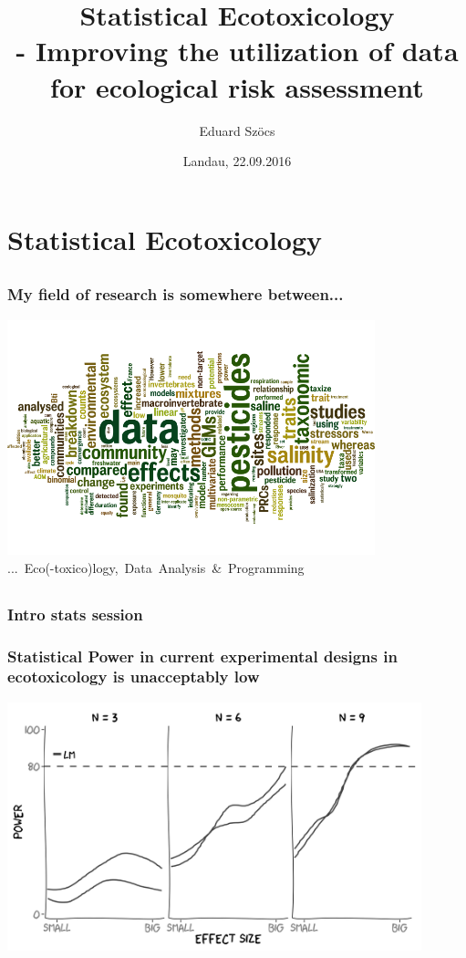 \documentclass[12pt, t, draft]{beamer}
\title{Statistical Ecotoxicology \\ - Improving the utilization of data for ecological risk assessment}
\author{Eduard Szöcs}
\institute{Institute for Environmental Sciences, University of Koblenz-Landau}
\date{Landau, 22.09.2016}
\begin{document}
\begin{frame}
\titlepage
\end{frame}


\section{Statistical Ecotoxicology} 
\subsection{}
\begin{frame}
\frametitle{My field of research is somewhere between...}
\center
\includegraphics[width = 0.8\textwidth]{fig/wc_all.png} \\
\mbox{... Eco(-toxico)logy, Data Analysis \& Programming}
\end{frame}


\subsection{}
\begin{frame}
\frametitle{Intro stats session}
\end{frame}


\begin{frame}
\frametitle{Statistical Power in current experimental designs in ecotoxicology is unacceptably low}
\center
\includegraphics[width = 0.9\textwidth]{fig/glm2.png} \\
\end{frame}
\end{document}
